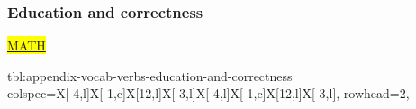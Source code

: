 \documentclass[../nihongo-gakushuu-kyouzai.tex]{subfiles}
\begin{document}
\subsubsection{Education and correctness}
\hl{\href{https://japanese.stackexchange.com/questions/56962/standard-mathematical-operations-expressed-in-japanese}{MATH}}

{tbl:appendix-vocab-verbs-education-and-correctness}  %
{
    colspec={X[-4,l]X[-1,c]X[12,l]X[-3,l]X[-4,l]X[-1,c]X[12,l]X[-3,l]},
    rowhead=2,
}  %
\end{document}
